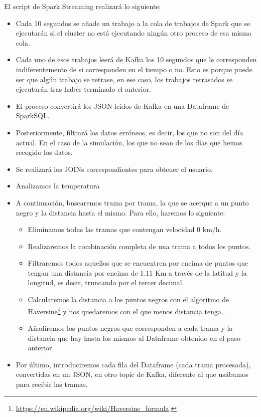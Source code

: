 El script de Spark Streaming realizará lo siguiente:

\begin{itemize}
        \item Cada 10 segundos se añade un trabajo a la cola de trabajos de Spark que se ejecutarán si el cluster no está ejecutando ningún otro proceso de esa misma cola.
        \item Cada uno de esos trabajos leerá de Kafka los 10 segundos que le corresponden indiferentemente de si corresponden en el tiempo o no. Esto es porque puede ser que algún trabajo se retrase, en ese caso, los trabajos retrasados se ejecutarán tras haber terminado el anterior.
        \item El proceso convertirá los JSON leídos de Kafka en una Dataframe de SparkSQL.
        \item Posteriormente, filtrará los datos erróneos, es decir, los que no son del día actual. En el caso de la simulación, los que no sean de los días que hemos recogido los datos.
        \item Se realizará los JOINs correspondientes para obtener el usuario.
        \item Analizamos la temperatura
        \item A continuación, buscaremos trama por trama, la que se acerque a un punto negro y la distancia hasta el mismo. Para ello, haremos lo siguiente:
        \begin{itemize}
                \item Eliminamos todas las tramas que contengan velocidad 0 km/h.
                \item Realizaremos la combinación completa de una trama a todos los puntos.
                \item Filtraremos todos aquellos que se encuentren por encima de puntos que tengan una distancia por encima de 1.11 Km a través de la latitud y la longitud, es decir, truncando por el tercer decimal.
                \item Calcularemos la distancia a los puntos negros con el
                  algoritmo de
                  Haversine\footnote{\url{https://en.wikipedia.org/wiki/Haversine_formula}.}
                  y nos quedaremos con el que menos distancia tenga.
                \item Añadiremos los puntos negros que corresponden a cada trama y la distancia que hay hasta los mismos al Dataframe obtenido en el paso anterior.
        \end{itemize}
        \item Por último, introduciremos cada fila del Dataframe (cada trama procesada), convertidas en un JSON, en otro topic de Kafka, diferente al que usábamos para recibir las tramas.
\end{itemize}


